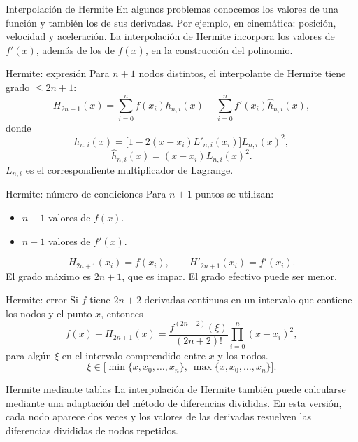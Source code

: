 \documentclass[main.tex]{subfiles}
\begin{document}
\graphicspath{{imagenes/tema10/}{../imagenes/tema10/}}

\begin{frame}[t]{Interpolación de Hermite}
En algunos problemas conocemos los valores de una función y también los de sus derivadas.
\bigskip
Por ejemplo, en cinemática: posición, velocidad y aceleración.
\bigskip
La interpolación de Hermite incorpora los valores de $f'(x)$, además de los de $f(x)$, en la construcción del polinomio.
\end{frame}
\begin{frame}[t]{Hermite: expresión}
\small Para $n+1$ nodos distintos, el interpolante de Hermite tiene grado $\le2n+1$:
\[H_{2n+1}(x)=\sum_{i=0}^n f(x_i)h_{n,i}(x)+\sum_{i=0}^n f'(x_i)\widehat h_{n,i}(x),\]
donde
\[h_{n,i}(x)=\big[1-2(x-x_i)L'_{n,i}(x_i)\big]L_{n,i}(x)^2,\]
\[\widehat h_{n,i}(x)=(x-x_i)L_{n,i}(x)^2.\]
$L_{n,i}$ es el correspondiente multiplicador de Lagrange.
\end{frame}
\begin{frame}[t]{Hermite: número de condiciones}
Para $n+1$ puntos se utilizan:
\begin{itemize}
\item $n+1$ valores de $f(x)$.
\item $n+1$ valores de $f'(x)$.
\end{itemize}
\[H_{2n+1}(x_i)=f(x_i),\qquad H'_{2n+1}(x_i)=f'(x_i).\]
El grado máximo es $2n+1$, que es impar. El grado efectivo puede ser menor.
\end{frame}
\begin{frame}[t]{Hermite: error}
\small Si $f$ tiene $2n+2$ derivadas continuas en un intervalo que contiene los nodos y el punto $x$, entonces
\[f(x)-H_{2n+1}(x)=\frac{f^{(2n+2)}(\xi)}{(2n+2)!}\prod_{i=0}^n(x-x_i)^2,\]
para algún $\xi$ en el intervalo comprendido entre $x$ y los nodos.
\[\xi\in\big[\min\{x,x_0,\ldots,x_n\},\ \max\{x,x_0,\ldots,x_n\}\big].\]
\end{frame}
\begin{frame}[t]{Hermite mediante tablas}
La interpolación de Hermite también puede calcularse mediante una adaptación del método de diferencias divididas.
\bigskip
En esta versión, cada nodo aparece dos veces y los valores de las derivadas resuelven las diferencias divididas de nodos repetidos.
\end{frame}
\end{document}
